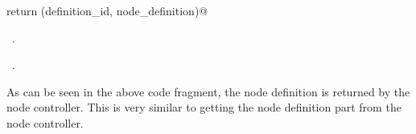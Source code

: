 \documentclass[
    a4paper,      %
    10pt,         %
    openright,    %
    notitlepage,  %
    parskip=half, %
]{scrreprt}       %
\theoremstyle{definition}                    %
\begin{document}
\begin{flushleft}
\begin{minipage}{\linewidth}
\begin{list}{}{}
\mbox{}\lstinline@    return (definition_id, node_definition)@\\
\mbox{}\lstinline@@{\NWsep}
\end{list}
\vspace{-1.5ex}
\footnotesize
\begin{list}{}{\setlength{\itemsep}{-\parsep}\setlength{\itemindent}{-\leftmargin}}
\item \NWtxtMacroDefBy\ .
\item \NWtxtMacroRefIn\ .

\item{}
\end{list}
\end{minipage}\vspace{4ex}
\end{flushleft}
As can be seen in the above code fragment, the node definition is returned by
the node controller. This is very similar to getting the node definition part
from the node controller.
\end{document}
